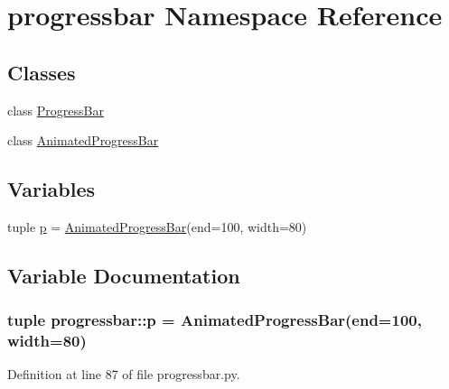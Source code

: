 \hypertarget{namespaceprogressbar}{
\section{progressbar Namespace Reference}
\label{namespaceprogressbar}
}
\subsection*{Classes}
\begin{DoxyCompactItemize}
\item 
class \hyperlink{classprogressbar_1_1ProgressBar}{ProgressBar}
\item 
class \hyperlink{classprogressbar_1_1AnimatedProgressBar}{AnimatedProgressBar}
\end{DoxyCompactItemize}
\subsection*{Variables}
\begin{DoxyCompactItemize}
\item 
tuple \hyperlink{namespaceprogressbar_a5bff78442f584f9477b429912b328ac9}{p} = \hyperlink{classprogressbar_1_1AnimatedProgressBar}{AnimatedProgressBar}(end=100, width=80)
\end{DoxyCompactItemize}


\subsection{Variable Documentation}
\hypertarget{namespaceprogressbar_a5bff78442f584f9477b429912b328ac9}{
\subsubsection[{p}]{\setlength{\rightskip}{0pt plus 5cm}tuple {\bf progressbar::p} = {\bf AnimatedProgressBar}(end=100, width=80)}}
\label{namespaceprogressbar_a5bff78442f584f9477b429912b328ac9}


Definition at line 87 of file progressbar.py.